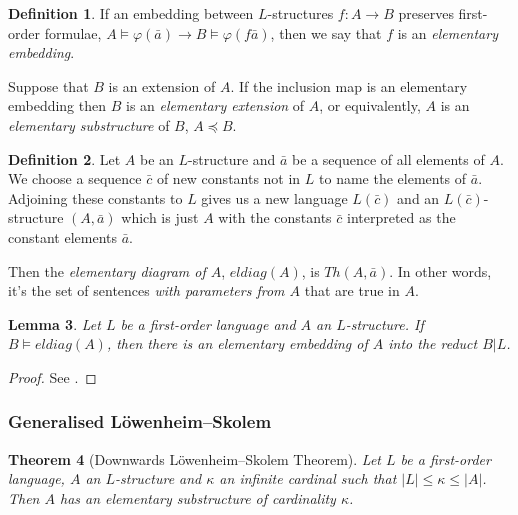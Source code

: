 \documentclass[10pt, a4paper, oneside]{article}
\newtheorem{thm}{Theorem}[section]
\theoremstyle{definition}
\newtheorem{dfn}[thm]{Definition}
\theoremstyle{remark}
\theoremstyle{plain}
\newtheorem{lem}[thm]{Lemma}
\theoremstyle{plain}
\begin{document}
\begin{dfn}
    If an embedding between $L$-structures $f : A \rightarrow B$ preserves
    first-order formulae, $A \models \varphi(\bar{a}) \rightarrow B \models
    \varphi(f\bar{a})$, then we say that $f$ is an \emph{elementary embedding}.
    
    Suppose that $B$ is an extension of $A$. If the inclusion map is an
    elementary embedding then $B$ is an \emph{elementary extension} of $A$, or
    equivalently, $A$ is an \emph{elementary substructure} of $B$, $A
    \preccurlyeq B$.
\end{dfn}

\begin{dfn}
    Let $A$ be an $L$-structure and $\bar{a}$ be a sequence of all elements of
    $A$. We choose a sequence $\bar{c}$ of new constants not in $L$ to name the
    elements of $\bar{a}$. Adjoining these constants to $L$ gives us a new
    language $L(\bar{c})$ and an $L(\bar{c})$-structure $(A, \bar{a})$ which is
    just $A$ with the constants $\bar{c}$ interpreted as the constant elements
    $\bar{a}$.
    
    Then the \emph{elementary diagram of $A$}, $eldiag(A)$, is $Th(A, \bar{a})$.
    In other words, it's the set of sentences \emph{with parameters from $A$}
    that are true in $A$.
\end{dfn}

\begin{lem}
    \label{lem:eldiag_lem}
    Let $L$ be a first-order language and $A$ an $L$-structure. If $B \models
    eldiag(A)$, then there is an elementary embedding of $A$ into the reduct
    $B | L$.
\end{lem}

\begin{proof}
    See \citealt[p. 49]{hodges1997}.
\end{proof}

\subsubsection{Generalised Löwenheim--Skolem}

\begin{thm}[Downwards Löwenheim--Skolem Theorem]
    \label{thm:down_lst_gen}
    Let $L$ be a first-order language, $A$ an $L$-structure and $\kappa$ an
    infinite cardinal such that $|L| \leq \kappa \leq |A|$. Then $A$ has an
    elementary substructure of cardinality $\kappa$.
\end{thm}
\end{document}
